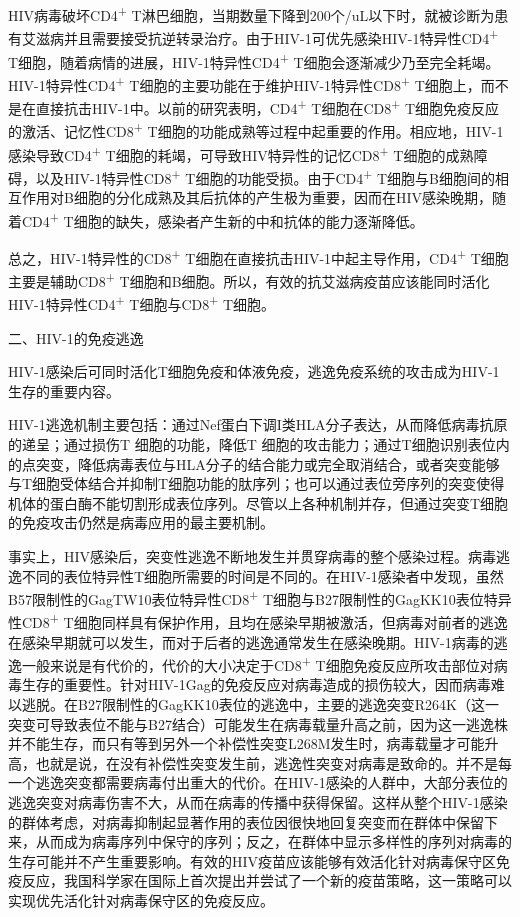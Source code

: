 HIV病毒破坏CD4\textsuperscript{+}
T淋巴细胞，当期数量下降到200个/uL以下时，就被诊断为患有艾滋病并且需要接受抗逆转录治疗。由于HIV-1可优先感染HIV-1特异性CD4\textsuperscript{+}
T细胞，随着病情的进展，HIV-1特异性CD4\textsuperscript{+}
T细胞会逐渐减少乃至完全耗竭。HIV-1特异性CD4\textsuperscript{+}
T细胞的主要功能在于维护HIV-1特异性CD8\textsuperscript{+}
T细胞上，而不是在直接抗击HIV-1中。以前的研究表明，CD4\textsuperscript{+}
T细胞在CD8\textsuperscript{+}
T细胞免疫反应的激活、记忆性CD8\textsuperscript{+}
T细胞的功能成熟等过程中起重要的作用。相应地，HIV-1感染导致CD4\textsuperscript{+}
T细胞的耗竭，可导致HIV特异性的记忆CD8\textsuperscript{+}
T细胞的成熟障碍，以及HIV-1特异性CD8\textsuperscript{+}
T细胞的功能受损。由于CD4\textsuperscript{+}
T细胞与B细胞间的相互作用对B细胞的分化成熟及其后抗体的产生极为重要，因而在HIV感染晚期，随着CD4\textsuperscript{+}
T细胞的缺失，感染者产生新的中和抗体的能力逐渐降低。

总之，HIV-1特异性的CD8\textsuperscript{+}
T细胞在直接抗击HIV-1中起主导作用，CD4\textsuperscript{+}
T细胞主要是辅助CD8\textsuperscript{+}
T细胞和B细胞。所以，有效的抗艾滋病疫苗应该能同时活化HIV-1特异性CD4\textsuperscript{+}
T细胞与CD8\textsuperscript{+} T细胞。

\begin{center}
 {\large 二、HIV-1的免疫逃逸}
 \end{center}

HIV-1感染后可同时活化T细胞免疫和体液免疫，逃逸免疫系统的攻击成为HIV-1生存的重要内容。

HIV-1逃逸机制主要包括：通过Nef蛋白下调I类HLA分子表达，从而降低病毒抗原的递呈；通过损伤T
细胞的功能，降低T
细胞的攻击能力；通过T细胞识别表位内的点突变，降低病毒表位与HLA分子的结合能力或完全取消结合，或者突变能够与T细胞受体结合并抑制T细胞功能的肽序列；也可以通过表位旁序列的突变使得机体的蛋白酶不能切割形成表位序列。尽管以上各种机制并存，但通过突变T细胞的免疫攻击仍然是病毒应用的最主要机制。

事实上，HIV感染后，突变性逃逸不断地发生并贯穿病毒的整个感染过程。病毒逃逸不同的表位特异性T细胞所需要的时间是不同的。在HIV-1感染者中发现，虽然B57限制性的GagTW10表位特异性CD8\textsuperscript{+}
T细胞与B27限制性的GagKK10表位特异性CD8\textsuperscript{+}
T细胞同样具有保护作用，且均在感染早期被激活，但病毒对前者的逃逸在感染早期就可以发生，而对于后者的逃逸通常发生在感染晚期。HIV-1病毒的逃逸一般来说是有代价的，代价的大小决定于CD8\textsuperscript{+}
T细胞免疫反应所攻击部位对病毒生存的重要性。针对HIV-1Gag的免疫反应对病毒造成的损伤较大，因而病毒难以逃脱。在B27限制性的GagKK10表位的逃逸中，主要的逃逸突变R264K（这一突变可导致表位不能与B27结合）可能发生在病毒载量升高之前，因为这一逃逸株并不能生存，而只有等到另外一个补偿性突变L268M发生时，病毒载量才可能升高，也就是说，在没有补偿性突变发生前，逃逸性突变对病毒是致命的。并不是每一个逃逸突变都需要病毒付出重大的代价。在HIV-1感染的人群中，大部分表位的逃逸突变对病毒伤害不大，从而在病毒的传播中获得保留。这样从整个HIV-1感染的群体考虑，对病毒抑制起显著作用的表位因很快地回复突变而在群体中保留下来，从而成为病毒序列中保守的序列；反之，在群体中显示多样性的序列对病毒的生存可能并不产生重要影响。有效的HIV疫苗应该能够有效活化针对病毒保守区免疫反应，我国科学家在国际上首次提出并尝试了一个新的疫苗策略，这一策略可以实现优先活化针对病毒保守区的免疫反应。

